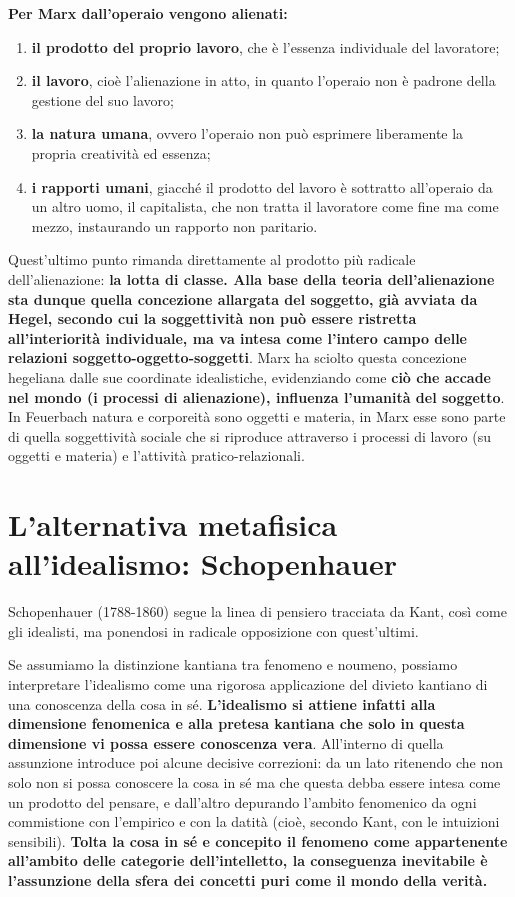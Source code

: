  \textbf{Per Marx dall'operaio vengono alienati:}
 
 \begin{enumerate}
 	\item \textbf{il prodotto del proprio lavoro}, che è l'essenza individuale del lavoratore;
 	\item \textbf{il lavoro}, cioè l'alienazione in atto, in quanto l'operaio non è padrone della gestione del suo lavoro;
 	\item \textbf{la natura umana}, ovvero l'operaio non può esprimere liberamente la propria creatività ed essenza;
 	\item \textbf{i rapporti umani}, giacché il prodotto del lavoro è sottratto all'operaio da un altro uomo, il capitalista, che non tratta il lavoratore come fine ma come mezzo, instaurando un rapporto non paritario.
 \end{enumerate}

Quest'ultimo punto rimanda direttamente al prodotto più radicale dell'alienazione: \textbf{la lotta di classe. Alla base della teoria dell'alienazione sta dunque quella concezione allargata del soggetto, già avviata da Hegel, secondo cui la soggettività non può essere ristretta all'interiorità individuale, ma va intesa come l'intero campo delle relazioni soggetto-oggetto-soggetti}. Marx ha sciolto questa concezione hegeliana dalle sue coordinate idealistiche, evidenziando come \textbf{ciò che accade nel mondo (i processi di alienazione), influenza l'umanità del soggetto}. In Feuerbach natura e corporeità sono oggetti e materia, in Marx esse sono parte di quella soggettività sociale che si riproduce attraverso i processi di lavoro (su oggetti e materia) e l'attività pratico-relazionali.

\section{L'alternativa metafisica all'idealismo: Schopenhauer}

Schopenhauer (1788-1860) segue la linea di pensiero tracciata da Kant, così come gli idealisti, ma ponendosi in radicale opposizione con quest'ultimi.

Se assumiamo la distinzione kantiana tra fenomeno e noumeno, possiamo interpretare l'idealismo come una rigorosa applicazione del divieto kantiano di una conoscenza della cosa in sé. \textbf{L'idealismo si attiene infatti alla dimensione fenomenica e alla pretesa kantiana che solo in questa dimensione vi possa essere conoscenza vera}. All’interno di quella assunzione introduce poi alcune decisive correzioni: da un lato ritenendo che non solo non si possa conoscere la cosa in sé ma che questa debba essere intesa come un prodotto del pensare, e dall’altro depurando l’ambito fenomenico da ogni commistione con l’empirico e con la datità (cioè, secondo Kant, con le intuizioni sensibili). \textbf{Tolta la cosa in sé e concepito il fenomeno come appartenente all’ambito delle categorie dell’intelletto, la conseguenza inevitabile è l’assunzione della sfera dei concetti puri come il mondo della verità.}

